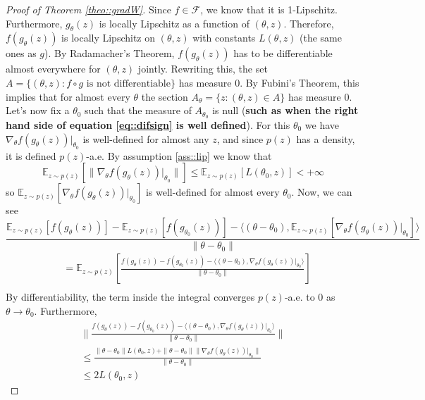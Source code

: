 \documentclass{article} %
\newcommand\EE{\mathbb{E}}
\theoremstyle{definition}
\theoremstyle{definition}
\newcommand\manF{\mathcal{F}}
\begin{document}
\begin{appendices}
\begin{proof}[Proof of Theorem \autoref{theo::gradW}]
  Since $f \in \manF$, we know that it is 1-Lipschitz.
  Furthermore, $g_\theta(z)$ is locally
  Lipschitz as a function of $(\theta, z)$. Therefore, 
  $f(g_\theta(z))$ is locally Lipschitz on $(\theta, z)$
  with constants $L(\theta, z)$ (the same ones as $g$).
  By Radamacher's Theorem, $f(g_\theta(z))$ has to be
  differentiable almost everywhere for $(\theta, z)$
  jointly. Rewriting this, the set $A = \{(\theta, z):
  \text{$f \circ g$ is not differentiable}\}$ has
  measure 0. By Fubini's Theorem, this implies that
  for almost every $\theta$ the section $A_\theta
  = \{z: (\theta, z) \in A\}$ has measure 0.
  Let's now fix a $\theta_0$ such that 
  the measure of $A_{\theta_0}$ is null (\textbf{such
    as when the right hand side of equation \eqref{eq::difsign}
    is well defined}). For this
  $\theta_0$ we have $\nabla_\theta f(g_\theta(z))|_{\theta_0}$
  is well-defined for almost any $z$, and since $p(z)$
  has a density, it is defined $p(z)$-a.e. By assumption
  \ref{ass::lip} we know that
  $$ \EE_{z \sim p(z)} [\|\nabla_\theta f(g_\theta(z))|_{\theta_0}\|]
  \leq \EE_{z \sim p(z)} [L(\theta_0, z)] < + \infty $$
  so $\EE_{z \sim p(z)} [\nabla_\theta f(g_\theta(z))|_{\theta_0}]$
  is well-defined for almost every $\theta_0$. Now, we can see
  \begin{equation}
    \frac{\EE_{z\sim p(z)}[f(g_\theta(z))] - \EE_{z \sim p(z)}[f(g_{\theta_0}(z))]
      - \langle (\theta - \theta_0), \EE_{z \sim p(z)} [\nabla_\theta f(g_\theta(z))|_{\theta_0}]
      \rangle}{\|\theta - \theta_0\|} \label{eq::diffquot}
  \end{equation}
  \begin{align*}
    &= \EE_{z \sim p(z)}\left[ \frac{f(g_\theta(z)) - f(g_{\theta_0}(z))
        - \langle(\theta - \theta_0), \nabla_\theta f(g_\theta(z))|_{\theta_0}
        \rangle}{\|\theta - \theta_0\|}\right] \\
  \end{align*}
  By differentiability, the term inside the integral converges $p(z)$-a.e. to 0
  as $\theta \to \theta_0$. Furthermore,
  \begin{multline*}
    \|\frac{f(g_\theta(z)) - f(g_{\theta_0}(z))
      - \langle(\theta - \theta_0), \nabla_\theta f(g_\theta(z))|_{\theta_0}
      \rangle}{\|\theta - \theta_0\|}\|
    \\ \leq \frac{\|\theta - \theta_0\| L(\theta_0, z)
      + \|\theta - \theta_0\| \| \nabla_\theta f(g_\theta(z))|_{\theta_0}
      \|}{\|\theta - \theta_0\|}\\
    \leq 2 L(\theta_0, z)

\end{multline*}
\end{proof}
\end{appendices}
\end{document}
